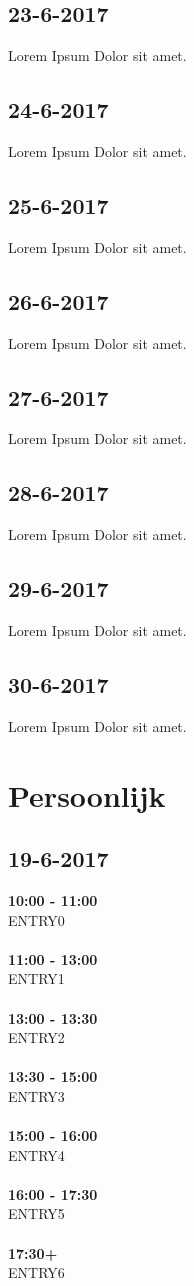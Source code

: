 \documentclass{uva-inf-article}
\begin{document}
\subsection{23-6-2017}
Lorem Ipsum Dolor sit amet.
\subsection{24-6-2017}
Lorem Ipsum Dolor sit amet.
\subsection{25-6-2017}
Lorem Ipsum Dolor sit amet.
\subsection{26-6-2017}
Lorem Ipsum Dolor sit amet.
\subsection{27-6-2017}
Lorem Ipsum Dolor sit amet.
\subsection{28-6-2017}
Lorem Ipsum Dolor sit amet.
\subsection{29-6-2017}
Lorem Ipsum Dolor sit amet.
\subsection{30-6-2017}
Lorem Ipsum Dolor sit amet.

\section{Persoonlijk}
\subsection{19-6-2017}
\textbf{10:00 - 11:00}\\
ENTRY0\\\\
\textbf{11:00 - 13:00}\\
ENTRY1\\\\
\textbf{13:00 - 13:30}\\
ENTRY2\\\\
\textbf{13:30 - 15:00}\\
ENTRY3\\\\
\textbf{15:00 - 16:00}\\
ENTRY4\\\\
\textbf{16:00 - 17:30}\\
ENTRY5\\\\
\textbf{17:30+}\\
ENTRY6\\
\end{document}
